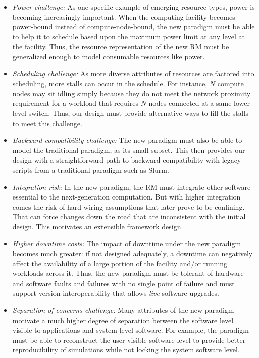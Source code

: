 \documentclass{article}
\newcommand{\slurm}{Slurm}
\begin{document}
\begin{itemize}
\item{\sl Power challenge:} As one specific example of emerging resource types,
      power is becoming increasingly important. When the computing
      facility becomes power-bound instead of compute-node-bound, the new
      paradigm must be able to help it to schedule based upon the 
      maximum power limit at any level at the facility. Thus, 
      the resource representation of the new RM must be generalized
      enough to model consumable resources like power.  
      
\item{\sl Scheduling challenge:} As more diverse attributes of resources
      are factored into scheduling, more stalls can occur in the schedule.
      For instance, $N$ compute nodes may sit idling simply because they do not meet
      the network proximity requirement for a workload that requires 
      $N$ nodes connected at a same lower-level switch. Thus, our design 
      must provide alternative ways to fill the stalls to meet this 
      challenge.

\item{\sl Backward compatibility challenge:} The new paradigm must also be
      able to model the traditional paradigm, as its small subset. This
      then provides our design with a straightforward path to 
      backward compatibility with legacy scripts from a traditional 
      paradigm such as \slurm.

\item{\sl Integration risk:} In the new paradigm, the RM must 
     integrate other software essential to the next-generation computation. 
     But with higher integration comes the risk of hard-wiring assumptions
     that later prove to be confining. That can force changes down the road
     that are inconsistent with the initial design. This motivates
     an extensible framework design. 
     
\item{\sl Higher downtime costs:} The impact of downtime under the 
     new paradigm becomes much greater: if not designed adequately, 
     a downtime can negatively affect the availability of
     a large portion of the facility and/or running workloads across it.
     Thus, the new paradigm must be tolerant of hardware and software faults 
     and failures with no single point of failure and must support version 
     interoperability that allows {\em live} software upgrades.

\item{\sl Separation-of-concerns challenge:} Many attributes of the new
     paradigm motivate a much higher degree of separation between
     the software level visible to applications and system-level 
     software. For example, the paradigm must be able to reconstruct the user-visible
     software level to provide better reproducibility of simulations while not
     locking the system software level. 
   

\end{itemize}
\end{document}
